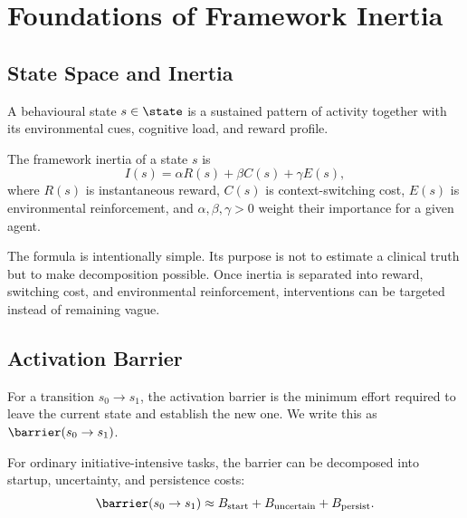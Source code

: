 \section{Foundations of Framework Inertia}
\label{sec:foundations}

\subsection{State Space and Inertia}

\begin{definition}
A behavioural state $s \in \state$ is a sustained pattern of activity together
with its environmental cues, cognitive load, and reward profile.
\end{definition}

\begin{definition}
The framework inertia of a state $s$ is
\[
I(s) = \alpha R(s) + \beta C(s) + \gamma E(s),
\]
where $R(s)$ is instantaneous reward, $C(s)$ is context-switching cost,
$E(s)$ is environmental reinforcement, and $\alpha, \beta, \gamma > 0$ weight
their importance for a given agent.
\end{definition}

\begin{remark}
The formula is intentionally simple. Its purpose is not to estimate a clinical
truth but to make decomposition possible. Once inertia is separated into
reward, switching cost, and environmental reinforcement, interventions can be
targeted instead of remaining vague.
\end{remark}

\subsection{Activation Barrier}

\begin{definition}
For a transition $s_0 \to s_1$, the activation barrier is the minimum effort
required to leave the current state and establish the new one. We write this as
$\barrier(s_0 \to s_1)$.
\end{definition}

\begin{proposition}
For ordinary initiative-intensive tasks, the barrier can be decomposed into
startup, uncertainty, and persistence costs:
\[
\barrier(s_0 \to s_1) \approx B_{\mathrm{start}} + B_{\mathrm{uncertain}} +
B_{\mathrm{persist}}.
\]
\end{proposition}

